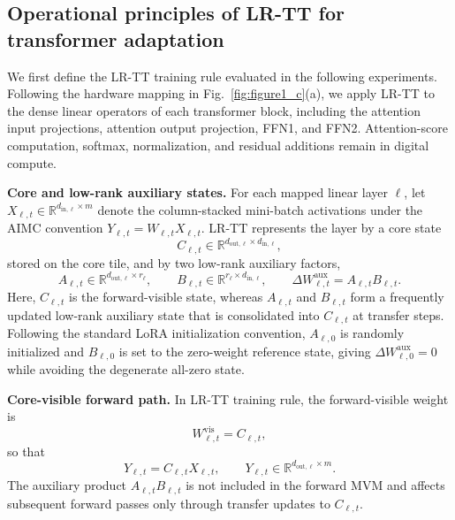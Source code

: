 \documentclass[AMA,LATO2COL]{WileyNJDv5}
\begin{document}
\subsection{Operational principles of LR-TT for transformer adaptation}
\label{subsec:results_lrtt_formulation}

\noindent
We first define the LR-TT training rule evaluated in the following experiments.
Following the hardware mapping in Fig.~\ref{fig:figure1_c}(a), we apply LR-TT to the dense linear operators of each transformer block, including the attention input projections, attention output projection, FFN1, and FFN2.
Attention-score computation, softmax, normalization, and residual additions remain in digital compute.

\noindent\textbf{Core and low-rank auxiliary states.}
For each mapped linear layer \(\ell\), let
\(X_{\ell,t}\in\mathbb{R}^{d_{\mathrm{in},\ell}\times m}\)
denote the column-stacked mini-batch activations under the AIMC convention
\(Y_{\ell,t}=W_{\ell,t}X_{\ell,t}\).
LR-TT represents the layer by a core state
\[
C_{\ell,t}\in\mathbb{R}^{d_{\mathrm{out},\ell}\times d_{\mathrm{in},\ell}},
\]
stored on the core tile, and by two low-rank auxiliary factors,
\begin{equation}
A_{\ell,t}\in\mathbb{R}^{d_{\mathrm{out},\ell}\times r_\ell},
\qquad
B_{\ell,t}\in\mathbb{R}^{r_\ell\times d_{\mathrm{in},\ell}},
\qquad
\Delta W_{\ell,t}^{\mathrm{aux}}=A_{\ell,t}B_{\ell,t}.
\label{eq:lrtt_lowrank_parameterization}
\end{equation}
Here, \(C_{\ell,t}\) is the forward-visible state, whereas \(A_{\ell,t}\) and \(B_{\ell,t}\) form a frequently updated low-rank auxiliary state that is consolidated into \(C_{\ell,t}\) at transfer steps.
Following the standard LoRA initialization convention, \(A_{\ell,0}\) is randomly initialized and \(B_{\ell,0}\) is set to the zero-weight reference state, giving
\(\Delta W_{\ell,0}^{\mathrm{aux}}=0\) while avoiding the degenerate all-zero state.

\noindent\textbf{Core-visible forward path.}
In LR-TT training rule, the forward-visible weight is
\begin{equation}
W^{\mathrm{vis}}_{\ell,t}=C_{\ell,t},
\label{eq:lrtt_visible_weight}
\end{equation}
so that
\begin{equation}
Y_{\ell,t}
=
C_{\ell,t}X_{\ell,t},
\qquad
Y_{\ell,t}\in\mathbb{R}^{d_{\mathrm{out},\ell}\times m}.
\label{eq:lrtt_layer_forward}
\end{equation}
The auxiliary product \(A_{\ell,t}B_{\ell,t}\) is not included in the forward MVM and affects subsequent forward passes only through transfer updates to \(C_{\ell,t}\).
\end{document}
